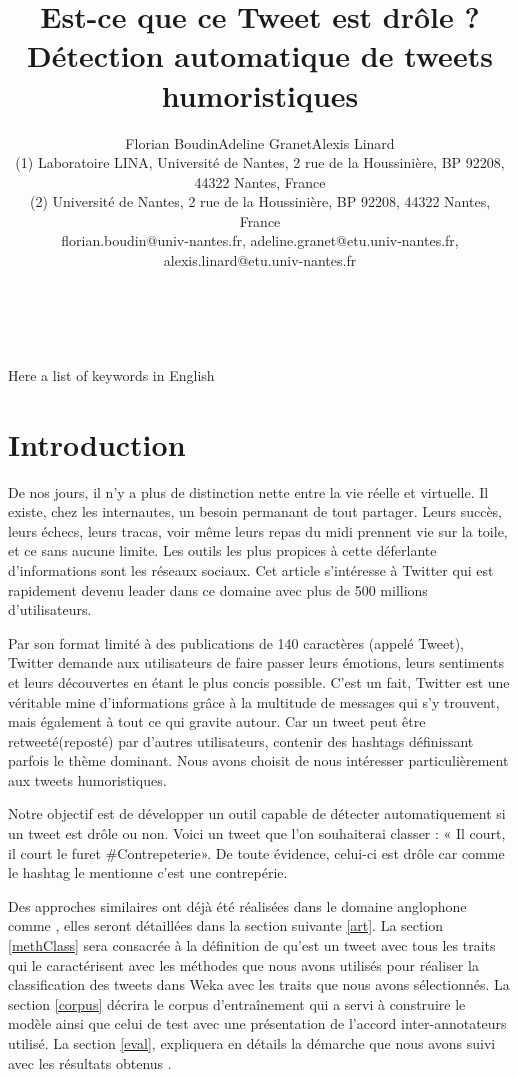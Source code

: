 \documentclass[10pt,a4paper,twoside]{article}
\title{Est-ce que ce Tweet est drôle ? Détection automatique de tweets humoristiques}
\author{Florian Boudin\up{1}\quad Adeline Granet\up{2}\quad Alexis Linard\up{2}\\
  (1) Laboratoire LINA, Université de Nantes, 2 rue de la Houssinière, BP 92208, 44322 Nantes, France \\ 
  (2) Université de Nantes, 2 rue de la Houssinière, BP 92208, 44322 Nantes, France\\ 
  florian.boudin@univ-nantes.fr, adeline.granet@etu.univ-nantes.fr, alexis.linard@etu.univ-nantes.fr \\ 
}
\begin{document}
\maketitle


\\

\\

{Here a list of keywords in English}


\section{Introduction}


De nos jours, il n’y a plus de distinction nette entre la vie réelle et virtuelle. Il existe, chez les internautes, un besoin permanant de tout partager. Leurs succès, leurs échecs, leurs tracas, voir même leurs repas du midi prennent vie sur la toile, et ce sans aucune limite. Les outils les plus propices à cette déferlante d’informations sont les réseaux sociaux. Cet article s'intéresse à Twitter qui est rapidement devenu leader dans ce domaine avec plus de 500 millions d’utilisateurs.

Par son format limité à des publications de 140 caractères (appelé Tweet), Twitter demande aux utilisateurs de faire passer leurs émotions, leurs sentiments et leurs découvertes en étant le plus concis possible. C’est un fait, Twitter est une véritable mine d’informations grâce à la multitude de messages qui s'y trouvent, mais également à tout ce qui gravite autour. Car un tweet peut être retweeté(reposté) par d'autres utilisateurs, contenir des hashtags définissant parfois le thème dominant.  Nous avons choisit de nous intéresser particulièrement aux tweets humoristiques.

Notre objectif est de développer un outil capable de détecter automatiquement si un tweet est drôle ou non. Voici un tweet que l’on souhaiterai classer : « Il court, il court le furet \#Contrepeterie».  De toute évidence, celui-ci est drôle car comme le hashtag le mentionne c’est une contrepérie. 

Des approches similaires ont déjà été réalisées dans le domaine anglophone comme \cite{Raz12, Barbosa2010}, elles seront détaillées dans la section suivante \ref{art}. La section \ref{methClass} sera consacrée à la définition de qu'est un tweet avec tous les traits qui le caractérisent avec les méthodes que nous avons utilisés pour réaliser la classification des tweets dans Weka avec les traits que nous avons sélectionnés. La section \ref{corpus} décrira le corpus d'entraînement qui a servi à construire le modèle ainsi que celui de test avec une présentation de l'accord inter-annotateurs utilisé. La section \ref{eval}, expliquera en détails la démarche que nous avons suivi avec les résultats obtenus .
\end{document}
